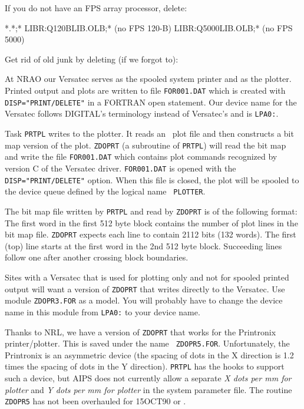 \noindent
If you do not have an FPS array processor, delete:\medskip

*.*;*
     LIBR:Q120BLIB.OLB;*            (no FPS 120-B)
     LIBR:Q5000LIB.OLB;*            (no FPS 5000)
\endfortran\medskip

\noindent
Get rid of old junk by deleting (if we forgot to):\medskip

\medskip


\medskip{}

\medskip{}

At NRAO our Versatec serves as the spooled system printer and as the
plotter.  Printed output and plots are written to file {\tt FOR001.DAT} which
is created  with {\tt DISP="PRINT/DELETE"} in a FORTRAN open statement.  Our
device name for the Versatec follows DIGITAL's terminology instead of
Versatec's and is {\tt LPA0:}.

Task {\tt PRTPL} writes to the plotter.  It reads an \aips\ plot file
and then constructs a bit map version of the plot.  {\tt ZDOPRT} (a
subroutine of {\tt PRTPL}) will read the bit map and write the file
{\tt FOR001.DAT} which contains plot commands recognized by version C
of the Versatec driver.  {\tt FOR001.DAT} is opened with the {\tt
DISP="PRINT/DELETE"} option.  When this file is closed, the plot will
be spooled to the device queue defined by the logical name {\tt
PLOTTER}.

The bit map file written by {\tt PRTPL} and read by {\tt ZDOPRT} is of the
following format:  The first word in the first 512 byte block contains
the number of plot lines in the bit map file.  {\tt ZDOPRT} expects each line
to contain 2112 bits (132 words).  The first (top) line starts at the
first word in the 2nd 512 byte block.  Succeeding lines follow one
after another crossing block boundaries.

Sites with a Versatec that is used for plotting only and not for
spooled printed output will want a version of {\tt ZDOPRT} that writes
directly to the Versatec.  Use module {\tt ZDOPR3.FOR} as a model.
You will probably have to change the device name in this module from
{\tt LPA0:} to your device name.

\medskip{}

Thanks to NRL, we have a version of {\tt ZDOPRT} that works for the
Printronix printer/plotter.  This is saved under the name {\tt
ZDOPR5.FOR}.  Unfortunately, the Printronix is an asymmetric device
(the spacing of dots in the X direction is 1.2 times the spacing of
dots in the Y direction).  {\tt PRTPL} has the hooks to support such a
device, but AIPS does not currently allow a separate {\it X dots per
mm for plotter\/} and {\it Y dots per mm for plotter\/} in the system
parameter file.  The routine {\tt ZDOPR5} has not been overhauled for
15OCT90 or \THISVER.

